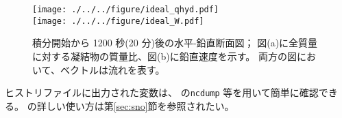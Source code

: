 \begin{figure}[t]
\begin{center}
  \texttt{[image: ./../../figure/ideal\_qhyd.pdf]}\\
  \texttt{[image: ./../../figure/ideal\_W.pdf]}\\
  \caption{積分開始から 1200 秒(20 分)後の水平-鉛直断面図；
           図(a)に全質量に対する凝結物の質量比、図(b)に鉛直速度を示す。
           両方の図において、ベクトルは流れを表す。}
  \label{fig_ideal}
\end{center}
\end{figure}

ヒストリファイルに出力された変数は、{\netcdf} の\verb|ncdump| 等を用いて簡単に確認できる。
\sno の詳しい使い方は第\ref{sec:sno}節を参照されたい。

